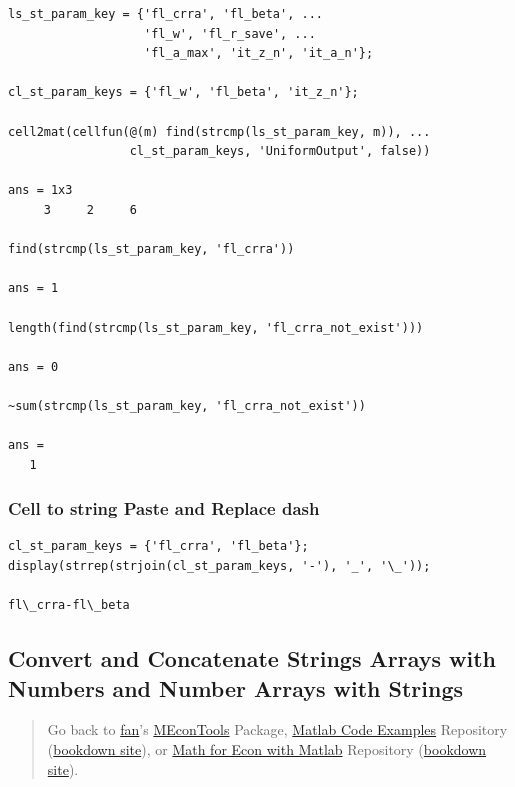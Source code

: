 \documentclass[
]{book}
\begin{document}
\begin{verbatim}
ls_st_param_key = {'fl_crra', 'fl_beta', ...
                   'fl_w', 'fl_r_save', ...
                   'fl_a_max', 'it_z_n', 'it_a_n'};

cl_st_param_keys = {'fl_w', 'fl_beta', 'it_z_n'};

cell2mat(cellfun(@(m) find(strcmp(ls_st_param_key, m)), ...
                 cl_st_param_keys, 'UniformOutput', false))

ans = 1x3    
     3     2     6

find(strcmp(ls_st_param_key, 'fl_crra'))

ans = 1

length(find(strcmp(ls_st_param_key, 'fl_crra_not_exist')))

ans = 0

~sum(strcmp(ls_st_param_key, 'fl_crra_not_exist'))

ans = 
   1
\end{verbatim}

\hypertarget{cell-to-string-paste-and-replace-dash}{%
\subsubsection{Cell to string Paste and Replace dash}\label{cell-to-string-paste-and-replace-dash}}

\begin{verbatim}
cl_st_param_keys = {'fl_crra', 'fl_beta'};
display(strrep(strjoin(cl_st_param_keys, '-'), '_', '\_'));

fl\_crra-fl\_beta
\end{verbatim}

\hypertarget{convert-and-concatenate-strings-arrays-with-numbers-and-number-arrays-with-strings}{%
\subsection{Convert and Concatenate Strings Arrays with Numbers and Number Arrays with Strings}\label{convert-and-concatenate-strings-arrays-with-numbers-and-number-arrays-with-strings}}

\begin{quote}
Go back to \href{http://fanwangecon.github.io/}{fan}'s \href{https://fanwangecon.github.io/MEconTools/}{MEconTools} Package, \href{https://fanwangecon.github.io/M4Econ/}{Matlab Code Examples} Repository (\href{https://fanwangecon.github.io/M4Econ/bookdown}{bookdown site}), or \href{https://fanwangecon.github.io/Math4Econ/}{Math for Econ with Matlab} Repository (\href{https://fanwangecon.github.io/Math4Econ/bookdown}{bookdown site}).
\end{quote}
\end{document}
